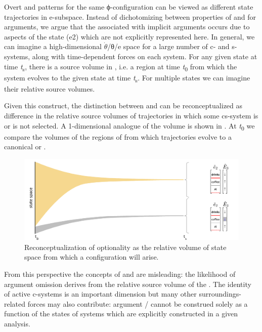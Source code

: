   Overt and  patterns for the same ϕ-con\-fig\-u\-ra\-tion can be viewed as different state trajectories in e-subspace. Instead of dichotomizing between properties of  and  for arguments, we argue that the  associated with implicit arguments occurs due to aspects of the state (e2) which are not explicitly represented here. In general, we can imagine a high-di\-men\-sional $\dot{\theta}$/θ/e space for a large number of c- and s-systems, along with time-dependent  forces on each system. For any given state at time \textit{t}\textsubscript{s}, there is a source volume in , i.e. a  region at time \textit{t}\textsubscript{0} from which the system evolves to the given state at time \textit{t}\textsubscript{s}. For multiple states we can imagine their relative source volumes. 

  Given this construct, the distinction between  and  can be reconceptualized as difference in the relative source volumes of trajectories in which some cs-system is or is not selected. A 1-di\-men\-sional analogue of the  volume is shown in {}. At \textit{t}\textsubscript{0} we compare the volumes of the regions of  from which trajectories evolve to a canonical or .

  
\begin{figure}
\includegraphics[width=\textwidth]{figures/Tilsen-img88.png}
\caption{Reconceptualization of optionality as the relative volume of state space from which a configuration will arise.}
\label{fig:4:38}
\end{figure}
 

  From this perspective the concepts of  and  are misleading: the likelihood of argument omission derives from the relative source volume of the . The identity of active c-systems is an important dimension but many other surroundings-related forces may also contribute: argument / cannot be construed solely as a function of the states of systems which are explicitly constructed in a given analysis.

